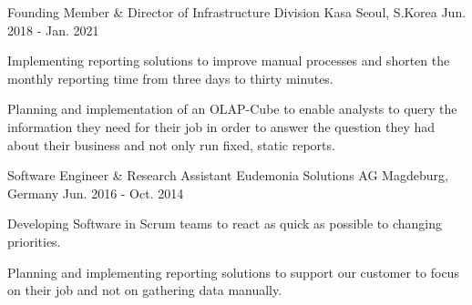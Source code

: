 \begin{cventries}
  \cventry
    {Founding Member \& Director of Infrastructure Division} %
    {Kasa} %
    {Seoul, S.Korea} %
    {Jun. 2018 - Jan. 2021} %
    {
      \begin{cvitems} %
        \item{Implementing reporting solutions to improve manual processes and shorten the monthly reporting time from three days to thirty minutes.}
        \item{Planning and implementation of an OLAP-Cube to enable analysts to query the information they need for their job in order to answer the question they had about their business and not only run fixed, static reports.}
      \end{cvitems}
    }
\cventry
    {Software Engineer \& Research Assistant} %
    {Eudemonia Solutions AG} %
    {Magdeburg, Germany} %
    {Jun. 2016 - Oct. 2014} %
    {
      \begin{cvitems} %
        \item{Developing Software in Scrum teams to react as quick as possible to changing priorities.}
        \item{Planning and implementing reporting solutions to support our customer to focus on their job and not on gathering data manually.}
      \end{cvitems}
    }

\end{cventries}
